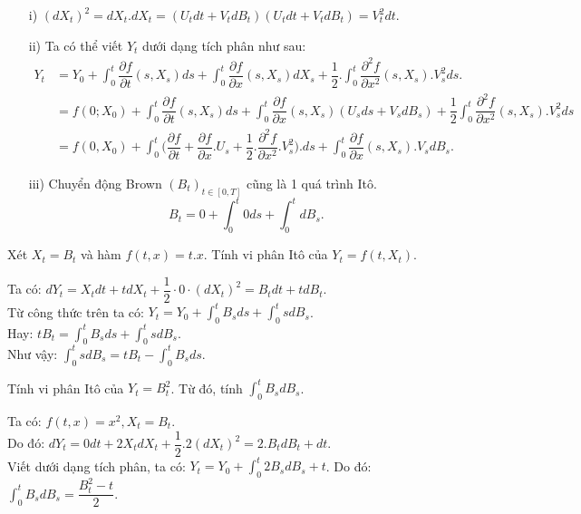 \begin{remark*}
\begin{itemize}
    \item[i)] $(dX_t)^2 = dX_t.dX_t=(U_tdt + V_tdB_t)(U_tdt + V_tdB_t)=V_t^2dt.$
    \item[ii)] Ta có thể viết $Y_t$ dưới dạng tích phân như sau: 
    \begin{align*}
        Y_t &=Y_0 + \displaystyle \int_0^t\dfrac{\partial f}{\partial t}(s,X_s)ds + \displaystyle \int_0^t\dfrac{\partial f}{\partial x}(s, X_s)dX_s + \dfrac{1}{2}.\displaystyle \int_0^t\dfrac{\partial^2 f}{\partial x^2}(s, X_s).V_s^2ds.\\
        &=f(0; X_0) +\displaystyle \int_0^t\dfrac{\partial f}{\partial t}(s, X_s)ds + \displaystyle \int_0^t\dfrac{\partial f}{\partial x}(s, X_s)(U_sds + V_sdB_s)+\dfrac{1}{2}\displaystyle \int_0^t\dfrac{\partial^2 f}{\partial x^2}(s, X_s).V_s^2ds\\
        &=f(0, X_0)+\displaystyle \int_0^t\bigg(\dfrac{\partial f}{\partial t}+\dfrac{\partial f}{\partial x}.U_s +\dfrac{1}{2}.\dfrac{\partial^2 f}{\partial x^2}.V_s^2\bigg).ds + \displaystyle \int_0^t\dfrac{\partial f}{\partial x}(s, X_s).V_sdB_s.
    \end{align*}
    \item[iii)] Chuyển động Brown $(B_t)_{t\in[0,T]}$ cũng là 1 quá trình Itô. \[ B_t = 0 + \displaystyle \int_0^t 0ds + \displaystyle \int_0^t dB_s.\]
\end{itemize}
\end{remark*}
\begin{exam*}
Xét $X_t = B_t$ và hàm $f(t, x) = t.x$. Tính vi phân Itô của $Y_t=f(t, X_t)$. 
\begin{sol*}
    Ta có: $dY_t = X_tdt + tdX_t + \dfrac{1}{2}\cdot 0\cdot(dX_t)^2 = B_tdt+tdB_t$. \\Từ công thức trên ta có: $Y_t = Y_0 +\displaystyle \int_0^t B_sds + \displaystyle \int_0^tsdB_s$. \\Hay: $tB_t = \displaystyle \int_0^tB_sds + \displaystyle \int_0^tsdB_s$. \\
    Như vậy: $\displaystyle \int_0^t sdB_s = tB_t - \displaystyle \int_0^t B_sds$.
\end{sol*} 
\end{exam*}
\begin{exam*}
Tính vi phân Itô của $Y_t=B_t^2$. Từ đó, tính $\displaystyle \int_0^tB_sdB_s$.
\begin{sol*}
    Ta có: $f(t, x) = x^2, X_t = B_t$. \\Do đó: $dY_t=0dt + 2X_tdX_t + \dfrac{1}{2}.2(dX_t)^2 = 2.B_tdB_t + dt$.\\
    Viết dưới dạng tích phân, ta có: $Y_t = Y_0 + \displaystyle \int_0^t2B_sdB_s + t$. Do đó: $\displaystyle \int_0^tB_sdB_s = \dfrac{B_t^2-t}{2}$.
\end{sol*}
\end{exam*}
